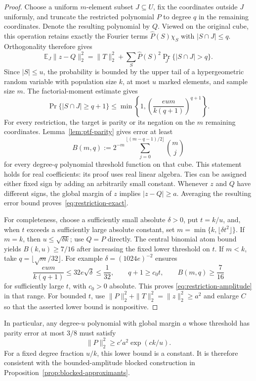 \begin{proof}
Choose a uniform $m$-element subset $J\subseteq U$, fix the coordinates
outside $J$ uniformly, and truncate the restricted polynomial $P$ to
degree $q$ in the remaining coordinates. Denote the resulting polynomial
by $Q$. Viewed on the original cube, this operation retains exactly the
Fourier terms $\widehat P(S)\chi_S$ with $|S\cap J|\le q$. Orthogonality
therefore gives
\[
 \mathbb E_J\|z-Q\|_2^2
 =\|T\|_2^2+
   \sum_S\widehat P(S)^2\Pr_J\{|S\cap J|>q\}.
\]
Since $|S|\le u$, the probability is bounded by the upper tail of a
hypergeometric random variable with population size $k$, at most $u$
marked elements, and sample size $m$. The factorial-moment estimate gives
\[
 \Pr\{|S\cap J|\ge q+1\}
 \le \min\!\left\{1,
       \left(\frac{eum}{k(q+1)}\right)^{q+1}\right\}.
\]
For every restriction, the target is parity or its negation on the
$m$ remaining coordinates. Lemma~\ref{lem:ptf-parity} gives error
at least
\[
 B(m,q):=2^{-m}\sum_{j=0}^{\lfloor(m-q-1)/2\rfloor}\binom mj
\]
for every degree-$q$ polynomial threshold function on that cube. This
statement holds for real coefficients: its proof uses real linear
algebra. Ties can be assigned either fixed sign by adding an arbitrarily
small constant. Whenever $z$ and $Q$ have different signs, the global
margin of $z$ implies $|z-Q|\ge a$. Averaging the resulting error bound
proves~\eqref{eq:restriction-exact}.

For completeness, choose a sufficiently small absolute $\delta>0$,
put $t=k/u$, and, when $t$ exceeds a sufficiently large absolute constant,
set $m=\min\{k,\lfloor\delta t^2\rfloor\}$. If $m=k$, then
$u\le\sqrt{\delta k}$; use $Q=P$ directly. The central binomial
atom bound yields $B(k,u)\ge7/16$ after increasing the fixed lower
threshold on $t$. If $m<k$, take $q=\lfloor\sqrt m/32\rfloor$.
For example $\delta=(1024e)^{-2}$ ensures
\[
 \frac{eum}{k(q+1)}\le32e\sqrt\delta\le\frac1{32},
 \qquad q+1\ge c_0 t,
 \qquad B(m,q)\ge\frac7{16}
\]
for sufficiently large $t$, with $c_0>0$ absolute. This proves
\eqref{eq:restriction-amplitude} in that range. For bounded $t$,
use $\|P\|_2^2+\|T\|_2^2=\|z\|_2^2\ge a^2$ and enlarge $C$ so
that the asserted lower bound is nonpositive.
\end{proof}

In particular, any degree-$u$ polynomial with global margin $a$ whose
threshold has parity error at most $3/8$ must satisfy
\[
 \|P\|_2^2\ge c' a^2\exp(c k/u).
\]
For a fixed degree fraction $u/k$, this lower bound is a constant. It is
therefore consistent with the bounded-amplitude blocked construction in
Proposition~\ref{prop:blocked-approximants}.


